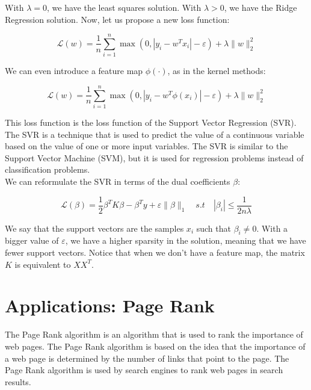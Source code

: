 With $\lambda = 0$, we have the least squares solution. With $\lambda > 0$, we have the Ridge Regression solution.
Now, let us propose a new loss function:

\begin{equation}
    \mathcal{L}(w) = \frac{1}{n} \sum_{i=1}^n \max(0, |y_i - w^T x_i| - \varepsilon) + \lambda \|w\|_2^2
\end{equation}

We can even introduce a feature map $\phi(\cdot)$, as in the kernel methods:

\begin{equation}
    \mathcal{L}(w) = \frac{1}{n} \sum_{i=1}^n \max(0, |y_i - w^T \phi(x_i)| - \varepsilon) + \lambda \|w\|_2^2
\end{equation}

This loss function is the loss function of the Support Vector Regression (SVR). The SVR is a 
technique that is used to predict the value of a continuous variable based on the value of one 
or more input variables. The SVR is similar to the Support Vector Machine (SVM), but it is used for 
regression problems instead of classification problems.\\

We can reformulate the SVR in terms of the dual coefficients $\beta$:

\begin{equation}
    \mathcal{L}(\beta) = \frac{1}{2} \beta^T K \beta - \beta^T y + \varepsilon \| \beta \|_1
    \quad s.t \quad |\beta_i| \leq \frac{1}{2 n \lambda}
\end{equation}

We say that the support vectors are the samples $x_i$ such that $\beta_i \neq 0$. With a bigger
value of $\varepsilon$, we have a higher sparsity in the solution, meaning that we have fewer support
vectors. Notice that when we don't have a feature map, the matrix $K$ is equivalent to
$X X^T$.\\

\section{Applications: Page Rank}

The Page Rank algorithm is an algorithm that is used to rank the importance of web pages. The Page Rank algorithm
is based on the idea that the importance of a web page is determined by the number of links that point to the page.
The Page Rank algorithm is used by search engines to rank web pages in search results.\\

